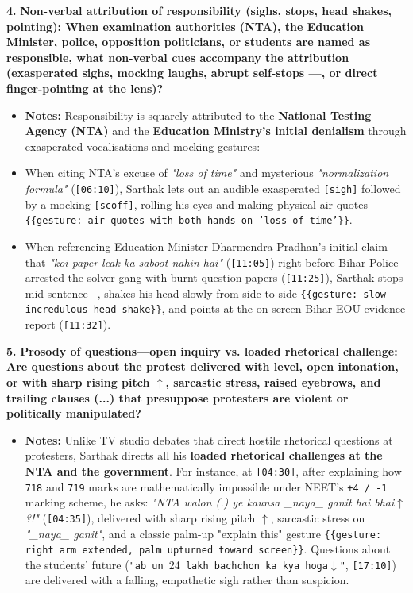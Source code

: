 \documentclass[10pt,a4paper]{article}
\begin{document}
\noindent\textbf{4.} \textbf{Non-verbal attribution of responsibility (sighs, stops, head shakes, pointing): When examination authorities (NTA), the Education Minister, police, opposition politicians, or students are named as responsible, what non-verbal cues accompany the attribution (exasperated sighs, mocking laughs, abrupt self-stops ---, or direct finger-pointing at the lens)?}\par\smallskip
\begin{itemize}
  \item \textbf{Notes:}
Responsibility is squarely attributed to the \textbf{National Testing Agency (NTA)} and the \textbf{Education Ministry's initial denialism} through exasperated vocalisations and mocking gestures:\par\smallskip
  \item When citing NTA's excuse of \textit{"loss of time"} and mysterious \textit{"normalization formula"} (\texttt{[06:10]}), Sarthak lets out an audible exasperated \texttt{[sigh]} followed by a mocking \texttt{[scoff]}, rolling his eyes and making physical air-quotes \texttt{\{\{gesture: air-quotes with both hands on 'loss of time'\}\}}.
  \item When referencing Education Minister Dharmendra Pradhan's initial claim that \textit{"koi paper leak ka saboot nahin hai"} (\texttt{[11:05]}) right before Bihar Police arrested the solver gang with burnt question papers (\texttt{[11:25]}), Sarthak stops mid-sentence \texttt{---}, shakes his head slowly from side to side \texttt{\{\{gesture: slow incredulous head shake\}\}}, and points at the on-screen Bihar EOU evidence report (\texttt{[11:32]}).
\end{itemize}

\noindent\textbf{5.} \textbf{Prosody of questions---open inquiry vs. loaded rhetorical challenge: Are questions about the protest delivered with level, open intonation, or with sharp rising pitch $\uparrow$, sarcastic stress, raised eyebrows, and trailing clauses (...) that presuppose protesters are violent or politically manipulated?}\par\smallskip
\begin{itemize}
  \item \textbf{Notes:}
Unlike TV studio debates that direct hostile rhetorical questions at protesters, Sarthak directs all his \textbf{loaded rhetorical challenges at the NTA and the government}. For instance, at \texttt{[04:30]}, after explaining how \texttt{718} and \texttt{719} marks are mathematically impossible under NEET's \texttt{+4 / -1} marking scheme, he asks: \textit{"NTA walon (.) ye kaunsa \_naya\_ ganit hai bhai$\uparrow$?!"} (\texttt{[04:35]}), delivered with sharp rising pitch \texttt{$\uparrow$}, sarcastic stress on \textit{"\_naya\_ ganit"}, and a classic palm-up "explain this" gesture \texttt{\{\{gesture: right arm extended, palm upturned toward screen\}\}}. Questions about the students' future (\texttt{"ab un }24\texttt{ lakh bachchon ka kya hoga$\downarrow$"}, \texttt{[17:10]}) are delivered with a falling, empathetic sigh rather than suspicion.\par\smallskip
\end{itemize}
\end{document}
